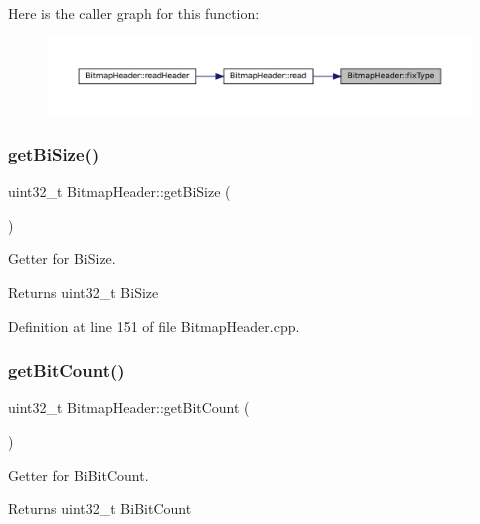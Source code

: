 Here is the caller graph for this function\+:\nopagebreak
\begin{figure}[H]
\begin{center}
\leavevmode
\includegraphics[width=350pt]{classBitmapHeader_aa02e59db95074c6a96a44dac03cee77b_icgraph}
\end{center}
\end{figure}
\mbox{\label{classBitmapHeader_acce4b6292e2aaf5dbd4bc10687c4fb65}} 
\subsubsection{\texorpdfstring{getBiSize()}{getBiSize()}}
{\footnotesize\ttfamily uint32\+\_\+t Bitmap\+Header\+::get\+Bi\+Size (\begin{DoxyParamCaption}{ }\end{DoxyParamCaption})}



Getter for Bi\+Size. 

\begin{DoxyReturn}{Returns}
uint32\+\_\+t Bi\+Size 
\end{DoxyReturn}


Definition at line 151 of file Bitmap\+Header.\+cpp.

\mbox{\label{classBitmapHeader_a2660782990f1d9547e0aef501f666969}} 
\subsubsection{\texorpdfstring{getBitCount()}{getBitCount()}}
{\footnotesize\ttfamily uint32\+\_\+t Bitmap\+Header\+::get\+Bit\+Count (\begin{DoxyParamCaption}{ }\end{DoxyParamCaption})}



Getter for Bi\+Bit\+Count. 

\begin{DoxyReturn}{Returns}
uint32\+\_\+t Bi\+Bit\+Count 
\end{DoxyReturn}


